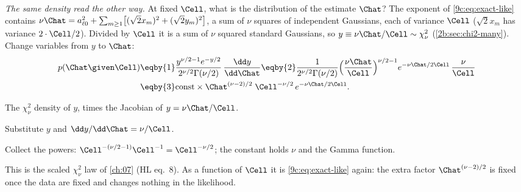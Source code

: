 \emph{The same density read the other way.} At fixed $\Cell$, what is the distribution of the estimate $\Chat$?
The exponent of \eqref{9c:eq:exact-like} contains $\nu\Chat=a_{\ell0}^2+\sum_{m\ge1}\bigl[(\sqrt2x_m)^2+(\sqrt2y_m)^2\bigr]$,
a sum of $\nu$ squares of independent Gaussians, each of variance $\Cell$ ($\sqrt2x_m$ has variance
$2\cdot\Cell/2$). Divided by $\Cell$ it is a sum of $\nu$ squared standard Gaussians, so
$y\equiv\nu\Chat/\Cell\sim\chi^2_\nu$ (\cref{2b:sec:chi2-many}). Change variables from $y$ to $\Chat$:
\begin{align}
  p(\Chat\given\Cell)
  &\eqby{1}\frac{y^{\nu/2-1}e^{-y/2}}{2^{\nu/2}\Gamma(\nu/2)}\,\frac{\dd y}{\dd\Chat}
   \eqby{2}\frac{1}{2^{\nu/2}\Gamma(\nu/2)}\Bigl(\frac{\nu\Chat}{\Cell}\Bigr)^{\nu/2-1}e^{-\nu\Chat/2\Cell}\,\frac{\nu}{\Cell}
   \nonumber\\
  &\eqby{3}\text{const}\times\Chat^{(\nu-2)/2}\;\Cell^{-\nu/2}\,e^{-\nu\Chat/2\Cell}.
  \label{9c:eq:chat-law}
\end{align}
\begin{explain}
  \item The $\chi^2_\nu$ density of $y$, times the Jacobian of $y=\nu\Chat/\Cell$.
  \item Substitute $y$ and $\dd y/\dd\Chat=\nu/\Cell$.
  \item Collect the powers: $\Cell^{-(\nu/2-1)}\Cell^{-1}=\Cell^{-\nu/2}$; the constant holds $\nu$ and the
        Gamma function.
\end{explain}
This is the scaled $\chi^2_\nu$ law of \cref{ch:07} (HL eq.~8). As a function of $\Cell$ it is
\eqref{9c:eq:exact-like} again: the extra factor $\Chat^{(\nu-2)/2}$ is fixed once the data are fixed and
changes nothing in the likelihood.

